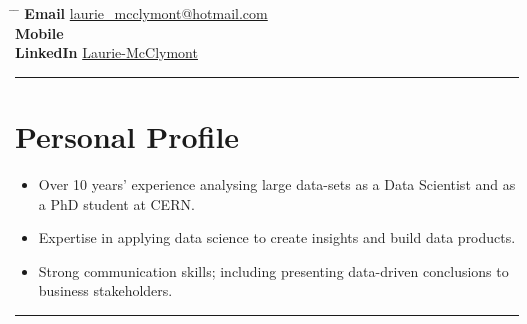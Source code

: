 \documentclass[10pt]{article} %
\begin{document}


\parbox{0.5\textwidth}{ %
\title{} %
}
\hspace{2cm} %
\parbox{0.5\textwidth}{ %
  \begin{tabbing} %
    \hspace{2cm} \= \hspace{3cm} \= \kill %
           {\bf Email} \> \href{mailto:laurie_mcclymont@hotmail.com}{laurie\_mcclymont@hotmail.com} \\ %
           {\bf Mobile}   \\ %
           {\bf LinkedIn} \> \href{https://www.linkedin.com/in/laurie-mcclymont-695520118/}{Laurie-McClymont} %
  \end{tabbing}
}

\rule{\textwidth}{0.5mm}


\vspace{-2mm}
\section{Personal Profile}
\begin{itemize}
\item{Over 10 years' experience analysing large data-sets as a Data Scientist and as a PhD student at CERN.}
\item{Expertise in applying data science to create insights and build data products.}
\item{Strong communication skills; including presenting data-driven conclusions to business stakeholders.}
\end{itemize}

\vspace{0.2mm}
\rule{\textwidth}{0.5mm}

\vspace{-2mm}
\end{document}
